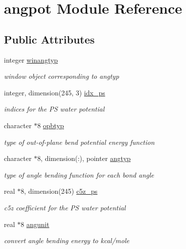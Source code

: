 \hypertarget{classangpot}{\section{angpot Module Reference}
\label{classangpot}
}
\subsection*{Public Attributes}
\begin{DoxyCompactItemize}
\item 
integer \hyperlink{classangpot_a4b84260ef5a4a0d7f4064fe36437910b}{winangtyp}
\begin{DoxyCompactList}\small\item\em window object corresponding to angtyp \end{DoxyCompactList}\item 
integer, dimension(245, 3) \hyperlink{classangpot_ac4149a45e7c9088c1871be5e677f5ddf}{idx\-\_\-ps}
\begin{DoxyCompactList}\small\item\em indices for the P\-S water potential \end{DoxyCompactList}\item 
character $\ast$8 \hyperlink{classangpot_a328cc042e26166f2def1064890ae696d}{opbtyp}
\begin{DoxyCompactList}\small\item\em type of out-\/of-\/plane bend potential energy function \end{DoxyCompactList}\item 
character $\ast$8, dimension(\-:), pointer \hyperlink{classangpot_a443bc09b102c6f7cd613d221d0f7a20c}{angtyp}
\begin{DoxyCompactList}\small\item\em type of angle bending function for each bond angle \end{DoxyCompactList}\item 
real $\ast$8, dimension(245) \hyperlink{classangpot_a1abb325651d097615a3d59f519f9ed2d}{c5z\-\_\-ps}
\begin{DoxyCompactList}\small\item\em c5z coefficient for the P\-S water potential \end{DoxyCompactList}\item 
real $\ast$8 \hyperlink{classangpot_a5ca3f03de196f4cc44eba96deb1f865a}{angunit}
\begin{DoxyCompactList}\small\item\em convert angle bending energy to kcal/mole \end{DoxyCompactList}\item 

\end{DoxyCompactItemize}
